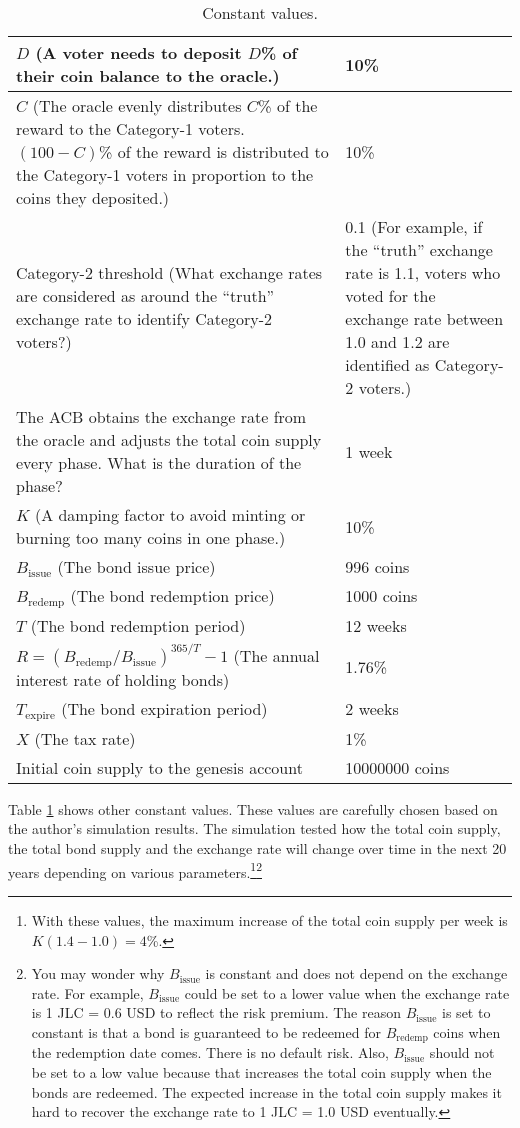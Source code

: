 \documentclass[dvipdfmx,a4paper]{article}
\begin{document}
\begin{table}[htb]
\begin{center}
\caption{Constant values.}\vspace{2ex}
\begin{tabular}{p{24em}|p{14em}}\hline
$D$ (A voter needs to deposit $D$\% of their coin balance to the oracle.) & 10\%\\\hline
$C$ (The oracle evenly distributes $C$\% of the reward to the Category-1 voters. $(100-C)$\% of the reward is distributed to the Category-1 voters in proportion to the coins they deposited.) & 10\%\\\hline
Category-2 threshold (What exchange rates are considered as around the ``truth'' exchange rate to identify Category-2 voters?) & 0.1 (For example, if the ``truth'' exchange rate is 1.1, voters who voted for the exchange rate between 1.0 and 1.2 are identified as Category-2 voters.)\\\hline
The ACB obtains the exchange rate from the oracle and adjusts the total coin supply every phase. What is the duration of the phase? & 1 week\\\hline
$K$ (A damping factor to avoid minting or burning too many coins in one phase.) & 10\%\\\hline
$B_{\mathrm{issue}}$ (The bond issue price) & 996 coins\\\hline
$B_{\mathrm{redemp}}$ (The bond redemption price) & 1000 coins\\\hline
$T$ (The bond redemption period) & 12 weeks\\\hline
$R=(B_{\mathrm{redemp}}/B_{\mathrm{issue}})^{365/T}-1$ (The annual interest rate of holding bonds) & 1.76\%\\\hline
$T_{\mathrm{expire}}$ (The bond expiration period) & 2 weeks\\\hline
$X$ (The tax rate) & 1\%\\\hline
Initial coin supply to the genesis account & 10000000 coins\\\hline
\end{tabular}
\label{table2}
\end{center}
\end{table}

Table \ref{table2} shows other constant values. These values are carefully chosen based on the author's simulation results. The simulation tested how the total coin supply, the total bond supply and the exchange rate will change over time in the next 20 years depending on various parameters.\footnote{With these values, the maximum increase of the total coin supply per week is $K(1.4 - 1.0)=4$\%.}\footnote{You may wonder why $B_{\mathrm{issue}}$ is constant and does not depend on the exchange rate. For example, $B_{\mathrm{issue}}$ could be set to a lower value when the exchange rate is 1 JLC = 0.6 USD to reflect the risk premium. The reason $B_{\mathrm{issue}}$ is set to constant is that a bond is guaranteed to be redeemed for $B_{\mathrm{redemp}}$ coins when the redemption date comes. There is no default risk. Also, $B_{\mathrm{issue}}$ should not be set to a low value because that increases the total coin supply when the bonds are redeemed. The expected increase in the total coin supply makes it hard to recover the exchange rate to 1 JLC = 1.0 USD eventually.}
\end{document}
